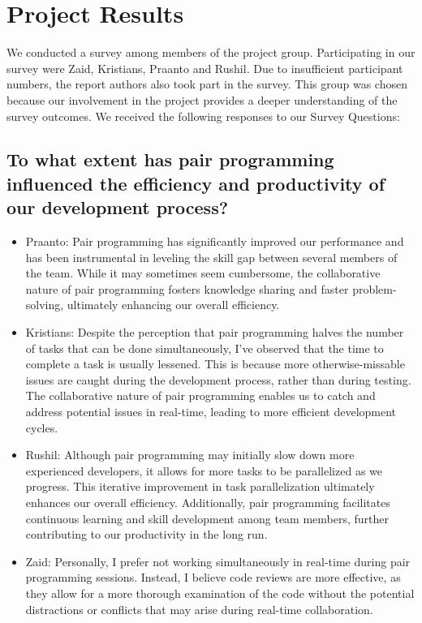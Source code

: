 \section{Project Results}
We conducted a survey among members of the project group. Participating in our survey were Zaid, Kristians, Praanto and Rushil. Due to insufficient participant numbers, the report authors also took part in the survey. This group was chosen because our involvement in the project provides a deeper understanding of the survey outcomes. We received the following responses to our Survey Questions:
\subsection{To what extent has pair programming influenced the efficiency and productivity of our development process?}
\begin{itemize}
    \item Praanto: Pair programming has significantly improved our performance and has been instrumental in leveling the skill gap between several members of the team. While it may sometimes seem cumbersome, the collaborative nature of pair programming fosters knowledge sharing and faster problem-solving, ultimately enhancing our overall efficiency.
    \item Kristians: Despite the perception that pair programming halves the number of tasks that can be done simultaneously, I've observed that the time to complete a task is usually lessened. This is because more otherwise-missable issues are caught during the development process, rather than during testing. The collaborative nature of pair programming enables us to catch and address potential issues in real-time, leading to more efficient development cycles.
    \item Rushil: Although pair programming may initially slow down more experienced developers, it allows for more tasks to be parallelized as we progress. This iterative improvement in task parallelization ultimately enhances our overall efficiency. Additionally, pair programming facilitates continuous learning and skill development among team members, further contributing to our productivity in the long run.
    \item Zaid: Personally, I prefer not working simultaneously in real-time during pair programming sessions. Instead, I believe code reviews are more effective, as they allow for a more thorough examination of the code without the potential distractions or conflicts that may arise during real-time collaboration.
\end{itemize}
